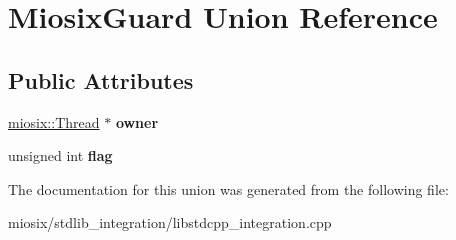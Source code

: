 \hypertarget{union_miosix_guard}{\section{Miosix\-Guard Union Reference}
\label{union_miosix_guard}
}
\subsection*{Public Attributes}
\begin{DoxyCompactItemize}
\item 
\hypertarget{union_miosix_guard_a329f3e0822b8bce11f798469690ec27f}{\hyperlink{classmiosix_1_1_thread}{miosix\-::\-Thread} $\ast$ {\bfseries owner}}\label{union_miosix_guard_a329f3e0822b8bce11f798469690ec27f}

\item 
\hypertarget{union_miosix_guard_ab2302f3362132fe9ffa4492effdf60ba}{unsigned int {\bfseries flag}}\label{union_miosix_guard_ab2302f3362132fe9ffa4492effdf60ba}

\end{DoxyCompactItemize}


The documentation for this union was generated from the following file\-:\begin{DoxyCompactItemize}
\item 
miosix/stdlib\-\_\-integration/libstdcpp\-\_\-integration.\-cpp\end{DoxyCompactItemize}
